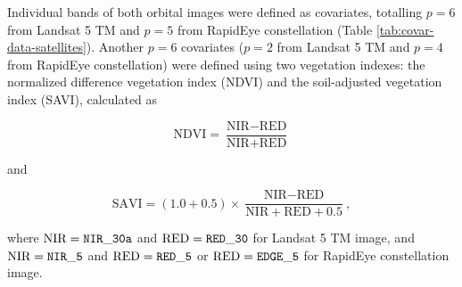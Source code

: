 Individual bands of both orbital images were defined as covariates, totalling $p = 6$ from Landsat 5 TM and 
$p = 5$ from RapidEye constellation (Table \ref{tab:covar-data-satellites}). Another $p = 6$ covariates ($p = 
2$ from Landsat 5 TM and $p = 4$ from RapidEye constellation) were defined using two vegetation indexes: the 
normalized difference vegetation index (NDVI) and the soil-adjusted vegetation index (SAVI), calculated as

\begin{equation}
 \text{NDVI} = \frac{\text{NIR} - \text{RED}}{\text{NIR} + \text{RED}}
\end{equation}\label{eq:ndvi}

\noindent and 

\begin{equation}
  \text{SAVI} = (1.0 + 0.5) \times \frac{\text{NIR} - \text{RED}}{\text{NIR} + \text{RED} + 0.5},
\end{equation}\label{eq:savi}

\noindent where $\text{NIR} = \tt{NIR\_30a}$ and $\text{RED} = \tt{RED\_30}$ for Landsat 5 TM image, and 
$\text{NIR} = \tt{NIR\_5}$ and $\text{RED} = \tt{RED\_5}$ or $\text{RED} = \tt{EDGE\_5}$ for RapidEye 
constellation image.
